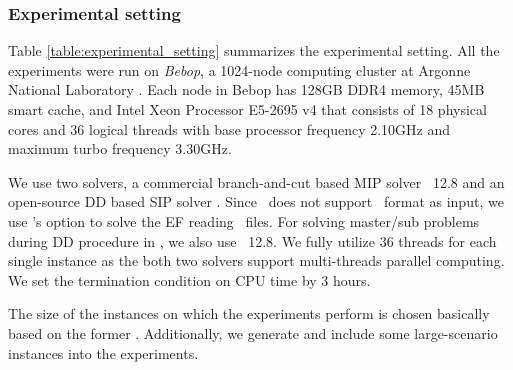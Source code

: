 \subsubsection{Experimental setting}
Table \ref{table:experimental_setting} summarizes the experimental setting. All the experiments were run on \textit{Bebop}, a 1024-node computing cluster at Argonne National Laboratory \cite{bebop}. Each node in Bebop has 128GB DDR4 memory, 45MB smart cache, and Intel Xeon Processor E5-2695 v4 that consists of 18 physical cores and 36 logical threads with base processor frequency 2.10GHz and maximum turbo frequency 3.30GHz. 

We use two solvers, a commercial branch-and-cut based MIP solver \cplex\ 12.8 and an open-source DD based SIP solver \dsp. Since \cplex\ does not support \smps\ format as input, we use \dsp's option to solve the EF reading \smps\ files. For solving master/sub problems during DD procedure in \dsp, we also use \cplex\ 12.8. We fully utilize 36 threads for each single instance as the both two solvers support multi-threads parallel computing. We set the termination condition on CPU time by 3 hours.  

The size of the instances on which the experiments perform is chosen basically based on the former \siplib. Additionally, we generate and include some large-scenario instances into the experiments.

\begin{table}[H]
	\centering
	\caption{Experimental setting}
	\label{table:experimental_setting}
\end{table}

